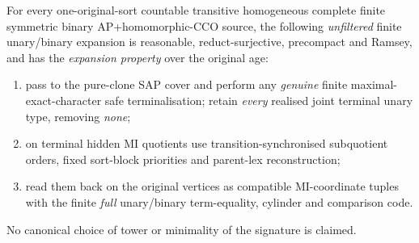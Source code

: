\begin{theorem}
\label{thm:ep-unfiltered-main}
For every one-original-sort countable transitive
homogeneous complete finite symmetric binary
AP+homomorphic-CCO source, the following
\emph{unfiltered} finite unary/binary
expansion is reasonable, reduct-surjective,
precompact and Ramsey, and has the
\emph{expansion property} over the
original age:
\begin{enumerate}[label=(\textup{\arabic*}),leftmargin=*]
\item pass to the pure-clone SAP cover and
perform any \emph{genuine} finite
maximal-exact-character safe terminalisation;
retain \emph{every} realised joint
terminal unary type, removing \emph{none};
\item on terminal hidden MI quotients
use transition-synchronised
subquotient orders, fixed sort-block
priorities and parent-lex reconstruction;
\item read them back on the
original vertices as compatible
MI-coordinate tuples with the
finite \emph{full} unary/binary
term-equality, cylinder and
comparison code.
\end{enumerate}
No canonical choice of tower or
minimality of the signature is claimed.
\end{theorem}
